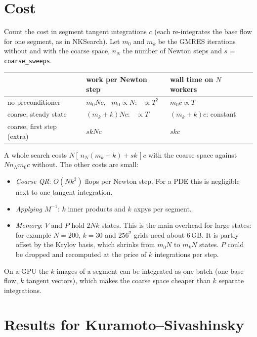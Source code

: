 \documentclass[11pt,a4paper]{article}
\begin{document}
\section{Cost}

Count the cost in segment tangent integrations $c$ (each re-integrates the base flow for one segment, as in NKSearch). Let $m_0$ and $m_k$ be the GMRES iterations without and with the coarse space, $n_N$ the number of Newton steps and $s$ = \texttt{coarse\_sweeps}.

\begin{center}
\begin{tabular}{lll}
\toprule
 & work per Newton step & wall time on $N$ workers \\
\midrule
no preconditioner & $m_0 N c$, \ $m_0 \propto N$: \ $\propto T^2$ & $m_0 c \propto T$\\
coarse, steady state & $(m_k + k) N c$: \ $\propto T$ & $(m_k + k)c$: constant\\
coarse, first step (extra) & $s k N c$ & $s k c$\\
\bottomrule
\end{tabular}
\end{center}

A whole search costs $N[\,n_N(m_k + k) + sk\,]c$ with the coarse space against $N n_N m_0 c$ without. The other costs are small:
\begin{itemize}
\item \emph{Coarse QR}: $O(Nk^3)$ flops per Newton step. For a PDE this is negligible next to one tangent integration.
\item \emph{Applying $M^{-1}$}: $k$ inner products and $k$ axpys per segment.
\item \emph{Memory}: $V$ and $P$ hold $2Nk$ states. This is the main overhead for large states: for example $N = 200$, $k = 30$ and $256^2$ grids need about 6\,GB. It is partly offset by the Krylov basis, which shrinks from $m_0 N$ to $m_k N$ states. $P$ could be dropped and recomputed at the price of $k$ integrations per step.
\end{itemize}
On a GPU the $k$ images of a segment can be integrated as one batch (one base flow, $k$ tangent vectors), which makes the coarse space cheaper than $k$ separate integrations.

\section{Results for Kuramoto--Sivashinsky}
\label{sec:results}
\end{document}
